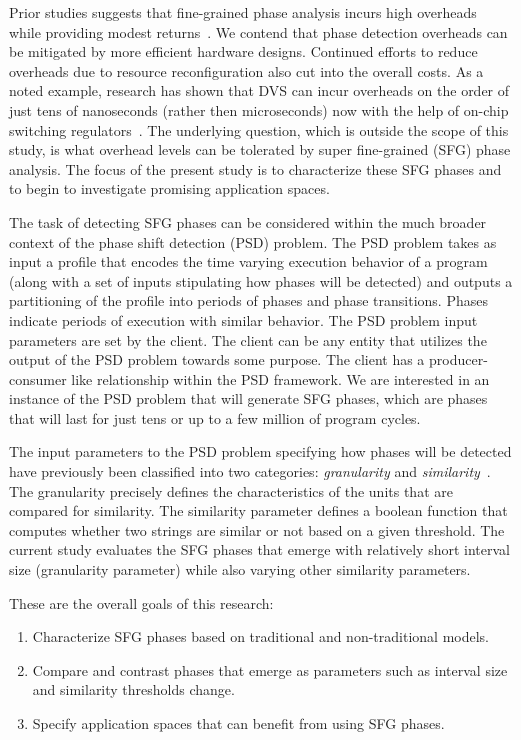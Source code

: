 Prior studies suggests that fine-grained phase analysis incurs high overheads while providing modest returns~\cite{Magklis:2003:PDV}\cite{Huang:2003:PAP}. We contend that phase detection overheads can be mitigated by more efficient hardware designs. Continued efforts to reduce overheads due to resource reconfiguration also cut into the overall costs. As a noted example, research has shown that DVS  can incur overheads on the order of just tens of nanoseconds (rather then microseconds) now with the help of on-chip switching regulators~\cite{Kim:2011:FLD}\cite{Kim:2008:HPC}. The underlying question, which is outside the scope of this study, is what overhead levels can be tolerated by super fine-grained (SFG) phase analysis. The focus of the present study is to characterize these SFG phases and to begin to investigate promising application spaces. 

The task of detecting SFG phases can be considered within the much broader context of the phase shift detection (PSD) problem. The PSD problem takes as input a profile that encodes the time varying execution behavior of a program (along with a set of inputs stipulating how phases will be detected) and outputs a partitioning of the profile into periods of phases and phase transitions. Phases indicate periods of execution with similar behavior. The PSD problem input parameters are set by the client. The client can be any entity that utilizes the output of the PSD problem towards some purpose. The client has a producer-consumer like relationship within the PSD framework. We are interested in an instance of the PSD problem that will generate SFG phases, which are phases that will last for just tens or up to a few million of program cycles.

The input parameters to the PSD problem specifying how phases will be detected have previously been classified into two categories: \emph{granularity} and \emph{similarity}~\cite{Hind03phaseshift}. The granularity precisely defines the characteristics of the units that are compared for similarity. The similarity parameter defines a boolean function that computes whether two strings are similar or not based on a given threshold. The current study evaluates the SFG phases that emerge with relatively short interval size (granularity parameter) while also varying other similarity parameters. 

These are the overall goals of this research: 

\begin{enumerate}
\item Characterize SFG phases based on traditional and non-traditional models.
\item Compare and contrast phases that emerge as parameters such as interval size and similarity thresholds change.
\item Specify application spaces that can benefit from using SFG phases.
\end{enumerate}



